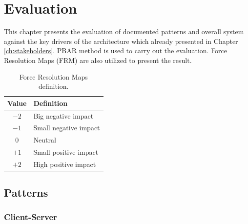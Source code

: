 
\clearpage
\chapter{Evaluation}
\label{ch:evaluation}
This chapter presents the evaluation of documented patterns and overall system
against the key drivers of the architecture which already presented in Chapter
\ref{ch:stakeholders}. PBAR\cite{pbar} method is used to carry out the
evaluation. Force Resolution Maps (FRM) are also utilized to present the result.

\begin{table}[H]
\centering
\caption{Force Resolution Maps definition.}
\label{tab:frm-table}
\begin{tabular}{cl}
\textbf{Value} & \textbf{Definition} \\ \toprule
            $-2$   & Big negative impact \\
            $-1$   & Small negative impact \\
            $0$    & Neutral \\
            $+1$   & Small positive impact \\
            $+2$   & High positive impact 
\end{tabular}
\end{table}

\section{Patterns}
\subsection{Client-Server}
